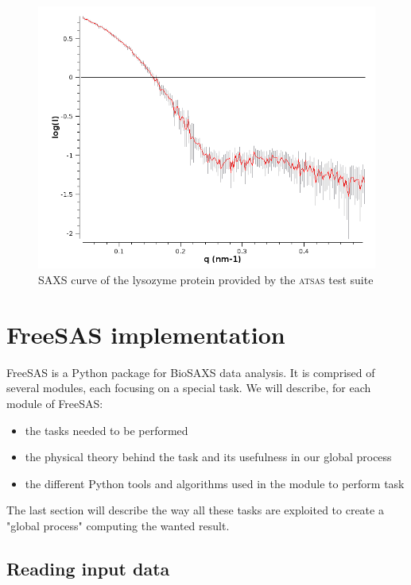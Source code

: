 \documentclass[a4paper, 11pt]{report}
\begin{document}
\begin{figure}
\centering
\includegraphics[scale=0.40]{saxscurve.png}
\caption{SAXS curve of the lysozyme protein provided by the 
  \textsc{atsas} test suite}
\label{fgr:saxscurve}
\end{figure}


\chapter{FreeSAS implementation}

FreeSAS is a Python package for BioSAXS data analysis. 
It is comprised of several modules, each focusing on a special task. 
We will describe, for each module of FreeSAS:
\begin{itemize}
 \item the tasks needed to be performed
 \item the physical theory behind the task and its usefulness in our 
       global process
 \item the different Python tools and algorithms used in the module to 
       perform task
\end{itemize}
The last section will describe the way all these tasks are exploited 
to create a "global process" computing the wanted result. 

\section{Reading input data}
\end{document}
